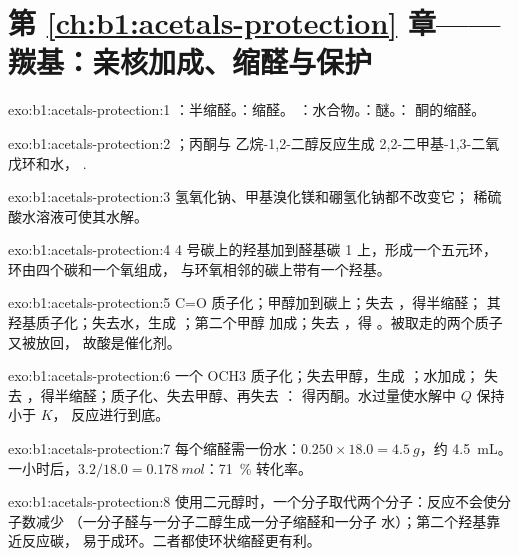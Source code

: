 \section*{第 \ref{ch:b1:acetals-protection} 章——羰基：亲核加成、缩醛与保护}

\begin{solution}{exo:b1:acetals-protection:1}
：半缩醛。：缩醛。
：水合物。：醚。：
酮的缩醛。
\end{solution}

\begin{solution}{exo:b1:acetals-protection:2}
；丙酮与
乙烷-1,2-二醇反应生成 2,2-二甲基-1,3-二氧戊环和水，
.
\end{solution}

\begin{solution}{exo:b1:acetals-protection:3}
氢氧化钠、甲基溴化镁和硼氢化钠都不改变它；
稀硫酸水溶液可使其水解。
\end{solution}

\begin{solution}{exo:b1:acetals-protection:4}
4 号碳上的羟基加到醛基碳 1 上，形成一个五元环，
环由四个碳和一个氧组成，
与环氧相邻的碳上带有一个羟基。
\end{solution}

\begin{solution}{exo:b1:acetals-protection:5}
C=O 质子化；甲醇加到碳上；失去 ，得半缩醛；
其羟基质子化；失去水，生成 ；第二个甲醇
加成；失去 ，得 。被取走的两个质子又被放回，
故酸是催化剂。
\end{solution}

\begin{solution}{exo:b1:acetals-protection:6}
一个 OCH3 质子化；失去甲醇，生成 ；水加成；
失去 ，得半缩醛；质子化、失去甲醇、再失去 ：
得丙酮。水过量使水解中 $Q$ 保持小于 $K$，
反应进行到底。
\end{solution}

\begin{solution}{exo:b1:acetals-protection:7}
每个缩醛需一份水：$0.250 \times 18.0 = \qty{4.5}{g}$，约
\qty{4.5}{mL}。一小时后，$3.2/18.0 = \qty{0.178}{mol}$：\qty{71}{\percent}
转化率。
\end{solution}

\begin{solution}{exo:b1:acetals-protection:8}
使用二元醇时，一个分子取代两个分子：反应不会使分子数减少
（一分子醛与一分子二醇生成一分子缩醛和一分子
水）；第二个羟基靠近反应碳，
易于成环。二者都使环状缩醛更有利。
\end{solution}

